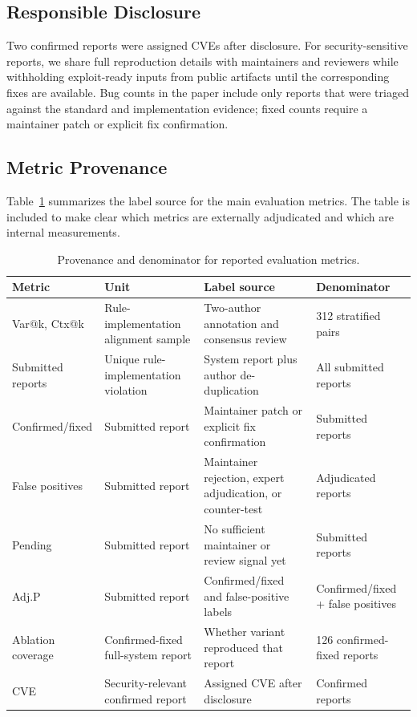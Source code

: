 \subsection{Responsible Disclosure}

Two confirmed reports were assigned CVEs after disclosure. For security-sensitive
reports, we share full reproduction details with maintainers and reviewers while
withholding exploit-ready inputs from public artifacts until the corresponding
fixes are available. Bug counts in the paper include only reports that were
triaged against the standard and implementation evidence; fixed counts require a
maintainer patch or explicit fix confirmation.

\subsection{Metric Provenance}

Table~\ref{tab:metric-provenance} summarizes the label source for the main
evaluation metrics. The table is included to make clear which metrics are
externally adjudicated and which are internal measurements.

\begin{table}[t]
\centering
\caption{Provenance and denominator for reported evaluation metrics.}
\label{tab:metric-provenance}
\small
\begin{tabular}{p{}p{}p{}p{}}
\toprule
\textbf{Metric} & \textbf{Unit} & \textbf{Label source} & \textbf{Denominator} \\
\midrule
Var@k, Ctx@k & Rule-implementation alignment sample & Two-author annotation and consensus review & 312 stratified pairs \\
Submitted reports & Unique rule-implementation violation & System report plus author de-duplication & All submitted reports \\
Confirmed/fixed & Submitted report & Maintainer patch or explicit fix confirmation & Submitted reports \\
False positives & Submitted report & Maintainer rejection, expert adjudication, or counter-test & Adjudicated reports \\
Pending & Submitted report & No sufficient maintainer or review signal yet & Submitted reports \\
Adj.P & Submitted report & Confirmed/fixed and false-positive labels & Confirmed/fixed + false positives \\
Ablation coverage & Confirmed-fixed full-system report & Whether variant reproduced that report & 126 confirmed-fixed reports \\
CVE & Security-relevant confirmed report & Assigned CVE after disclosure & Confirmed reports \\
\bottomrule
\end{tabular}
\end{table}

